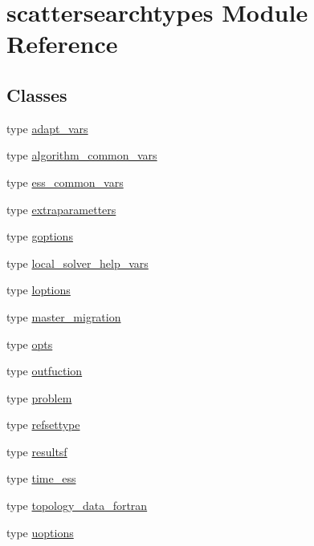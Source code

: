 \hypertarget{classscattersearchtypes}{\section{scattersearchtypes Module Reference}
\label{classscattersearchtypes}
}
\subsection*{Classes}
\begin{DoxyCompactItemize}
\item 
type \hyperlink{structscattersearchtypes_1_1adapt__vars}{adapt\-\_\-vars}
\item 
type \hyperlink{structscattersearchtypes_1_1algorithm__common__vars}{algorithm\-\_\-common\-\_\-vars}
\item 
type \hyperlink{structscattersearchtypes_1_1ess__common__vars}{ess\-\_\-common\-\_\-vars}
\item 
type \hyperlink{structscattersearchtypes_1_1extraparametters}{extraparametters}
\item 
type \hyperlink{structscattersearchtypes_1_1goptions}{goptions}
\item 
type \hyperlink{structscattersearchtypes_1_1local__solver__help__vars}{local\-\_\-solver\-\_\-help\-\_\-vars}
\item 
type \hyperlink{structscattersearchtypes_1_1loptions}{loptions}
\item 
type \hyperlink{structscattersearchtypes_1_1master__migration}{master\-\_\-migration}
\item 
type \hyperlink{structscattersearchtypes_1_1opts}{opts}
\item 
type \hyperlink{structscattersearchtypes_1_1outfuction}{outfuction}
\item 
type \hyperlink{structscattersearchtypes_1_1problem}{problem}
\item 
type \hyperlink{structscattersearchtypes_1_1refsettype}{refsettype}
\item 
type \hyperlink{structscattersearchtypes_1_1resultsf}{resultsf}
\item 
type \hyperlink{structscattersearchtypes_1_1time__ess}{time\-\_\-ess}
\item 
type \hyperlink{structscattersearchtypes_1_1topology__data__fortran}{topology\-\_\-data\-\_\-fortran}
\item 
type \hyperlink{structscattersearchtypes_1_1uoptions}{uoptions}
\end{DoxyCompactItemize}
